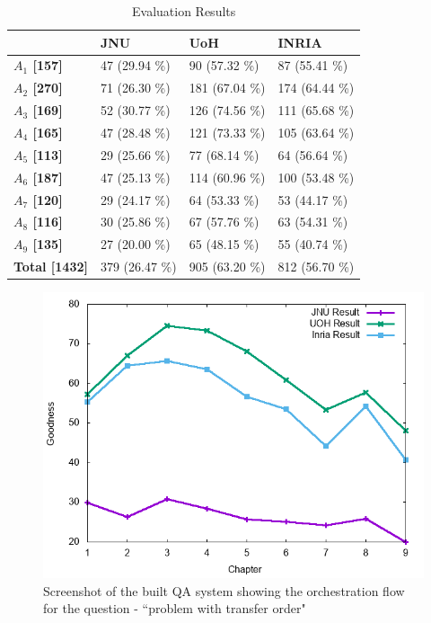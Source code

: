 \documentclass[11pt]{article}
\begin{document}
\begin{table}[h]
	\begin{center}
		\begin{tabular}{p{1.4cm} | p{1.6cm} | p{1.5cm} | p{1.5cm}}
			\hline 
			& \bf JNU & \bf UoH & \bf INRIA \\
			\hline
			
			
			\bf $A_1$ [157] &   47 (29.94 \%) &   90 (57.32 \%) &   87 (55.41 \%) \\
			\bf $A_2$ [270] &   71 (26.30 \%) &   181 (67.04 \%) &   174 (64.44 \%) \\
			\bf $A_3$ [169] &   52 (30.77 \%) &   126 (74.56 \%) &   111 (65.68 \%) \\
			\bf $A_4$ [165] &   47 (28.48 \%) &   121 (73.33 \%) &   105 (63.64 \%) \\
			\bf $A_5$ [113] &   29 (25.66 \%) &   77 (68.14 \%) &   64 (56.64 \%) \\
			\bf $A_6$ [187] &   47 (25.13 \%) &   114 (60.96 \%) &   100 (53.48 \%) \\
			\bf $A_7$ [120] &   29 (24.17 \%) &   64 (53.33 \%) &   53 (44.17 \%) \\
			\bf $A_8$ [116] &   30 (25.86 \%) &   67 (57.76 \%) &   63 (54.31 \%) \\
			\bf $A_9$ [135] &   27 (20.00 \%) &   65 (48.15 \%) &   55 (40.74 \%) \\
			\bf Total [1432] &   379 (26.47 \%) &   905 (63.20 \%) &   812 (56.70 \%) \\
			\hline
		\end{tabular}
	\end{center}
	\caption{\label{font-table} Evaluation Results }
\end{table}

\begin{figure}[!h]
	\center
	\includegraphics[scale=0.34]{images/merge.png}
	\caption{\label{screen}Screenshot of the built QA system showing the orchestration flow for the question - ``problem with transfer order"}
\end{figure}
\end{document}
